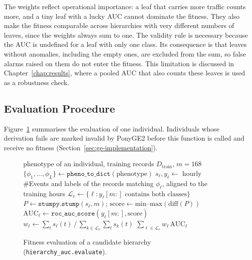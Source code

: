 The weights reflect operational importance: a leaf that carries more traffic counts more, and a tiny leaf with a lucky \ac{AUC} cannot dominate the fitness.
They also make the fitness comparable across hierarchies with very different numbers of leaves, since the weights always sum to one.
The validity rule is necessary because the \ac{AUC} is undefined for a leaf with only one class.
Its consequence is that leaves without anomalies, including the empty ones, are excluded from the sum, so false alarms raised on them do not enter the fitness.
This limitation is discussed in Chapter~\ref{chap:results}, where a pooled \ac{AUC} that also counts these leaves is used as a robustness check.

\subsection{Evaluation Procedure}

Figure~\ref{alg:fitness} summarises the evaluation of one individual.
Individuals whose derivation fails are marked invalid by PonyGE2 before this function is called and receive no fitness (Section~\ref{sec:ge-implementation}).

\begin{figure}[H]
    \centering
    \begin{minipage}{0.92\textwidth}
    \begin{algorithmic}[1]
        \Require phenotype of an individual, training records $D_{\text{train}}$, $m = 168$
        \State $\{\phi_1, \dots, \phi_L\} \gets \texttt{pheno\_to\_dict}(\text{phenotype})$ 
            \State $s_\ell, y_\ell \gets$ hourly \#Events and labels of the records matching $\phi_\ell$, aligned to the training hours
        \EndFor
        \State $\mathcal{L}_v \gets \{\ell : y_\ell[m{:}] \text{ contains both classes}\}$
            \State $P \gets \texttt{stumpy.stump}(s_\ell, m)$; \quad $\mathrm{score} \gets \text{min--max}(\mathrm{diff}(P))$
            \State $\mathrm{AUC}_\ell \gets \texttt{roc\_auc\_score}(y_\ell[m{:}], \mathrm{score})$
            \State $w_\ell \gets \sum_t s_\ell(t) \,/\, \sum_{k \in \mathcal{L}_v} \sum_t s_k(t)$
        \EndFor
        \State \Return $\sum_{\ell \in \mathcal{L}_v} w_\ell \, \mathrm{AUC}_\ell$
    \end{algorithmic}
    \end{minipage}
    \caption[Fitness evaluation of a candidate hierarchy]{Fitness evaluation of a candidate hierarchy (\texttt{hierarchy\_auc.evaluate}).}
    \label{alg:fitness}
\end{figure}

